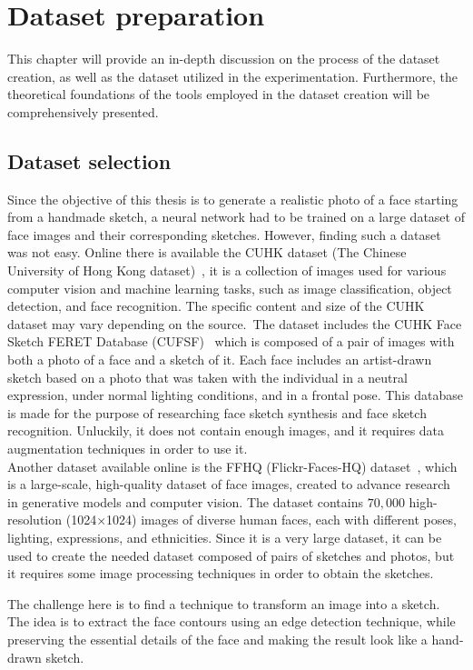 \newpage
\section{Dataset preparation}
\label{section:datasetChapter}
This chapter will provide an in-depth discussion on the process of the dataset creation, as well as the dataset utilized in the experimentation. Furthermore, the theoretical foundations of the tools employed in the dataset creation will be comprehensively presented.

\subsection{Dataset selection}
Since the objective of this thesis is to generate a realistic photo of a face starting from a handmade sketch, a neural network had to be trained on a large dataset of face images and their corresponding sketches. However, finding such a dataset was not easy. Online there is available the CUHK dataset (The Chinese University of Hong Kong dataset)~\cite{cuhk}, it is a collection of images used for various computer vision and machine learning tasks, such as image classification, object detection, and face recognition. The specific content and size of the CUHK dataset may vary depending on the source. The dataset includes the CUHK Face Sketch FERET Database (CUFSF)~\cite{facePhotoSketch-cuhk, coupledInformationTheoretic-cuhk} which is composed of a pair of images with both a photo of a face and a sketch of it. Each face includes an artist-drawn sketch based on a photo that was taken with the individual in a neutral expression, under normal lighting conditions, and in a frontal pose. This database is made for the purpose of researching face sketch synthesis and face sketch recognition. Unluckily, it does not contain enough images, and it requires data augmentation techniques in order to use it.  \\
Another dataset available online is the FFHQ (Flickr-Faces-HQ) dataset~\cite{ffhq}, which is a large-scale, high-quality dataset of face images, created to advance research in generative models and computer vision. The dataset contains $70,000$ high-resolution (1024×1024) images of diverse human faces, each with different poses, lighting, expressions, and ethnicities. Since it is a very large dataset, it can be used to create the needed dataset composed of pairs of sketches and photos, but it requires some image processing techniques in order to obtain the sketches.

\noindent The challenge here is to find a technique to transform an image into a sketch. The idea is to extract the face contours using an edge detection technique, while preserving the essential details of the face and making the result look like a hand-drawn sketch.

